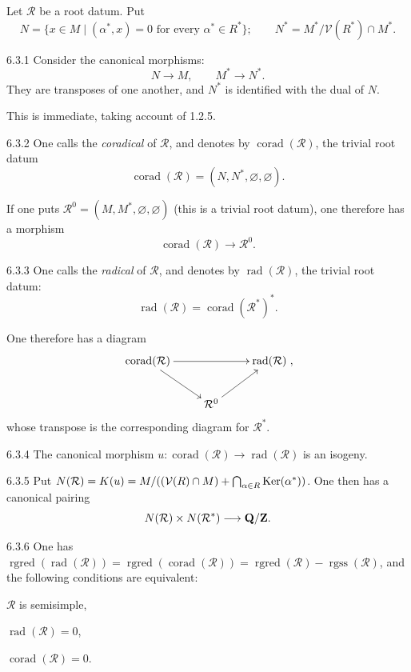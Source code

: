 Let $\mathcal R$ be a root datum. Put
\[
N=\{x\in M\mid(\alpha^*,x)=0\text{ for every }\alpha^*\in R^*\};\qquad
N^*=M^*/\mathcal V(R^*)\cap M^*.
\]
\begin{lemma}{6.3.1}\label{XXI.6.3.1}
Consider the canonical morphisms:
\[
N\to M,\qquad M^*\to N^*.
\]
They are transposes of one another, and $N^*$ is identified with the dual of $N$.
\end{lemma}
This is immediate, taking account of 1.2.5.
\begin{definition}{6.3.2}\label{XXI.6.3.2}
One calls the \emph{coradical} of $\mathcal R$, and denotes by $\operatorname{corad}(\mathcal R)$, the trivial root datum
\[
\operatorname{corad}(\mathcal R)=(N,N^*,\varnothing,\varnothing).
\]
\end{definition}
If one puts $\mathcal R^0=(M,M^*,\varnothing,\varnothing)$ (this is a trivial root datum), one therefore has a morphism
\[
\operatorname{corad}(\mathcal R)\to\mathcal R^0.
\]
\begin{definition}{6.3.3}\label{XXI.6.3.3}
One calls the \emph{radical} of $\mathcal R$, and denotes by $\operatorname{rad}(\mathcal R)$, the trivial root datum:
\[
\operatorname{rad}(\mathcal R)=\operatorname{corad}(\mathcal R^*)^*.
\]
{\renewcommand{\thefootnote}{(25)}}
\end{definition}
One therefore has a diagram
\[
\xymatrix{\operatorname{corad}(\mathcal R)\ar[rr]\ar[dr]&&\operatorname{rad}(\mathcal R)\\
&\mathcal R^0\ar[ur]&},
\]
whose transpose is the corresponding diagram for $\mathcal R^*$.
\begin{lemma}{6.3.4}\label{XXI.6.3.4}
The canonical morphism $u:\operatorname{corad}(\mathcal R)\to\operatorname{rad}(\mathcal R)$ is an isogeny.
\end{lemma}
\begin{definition}{6.3.5}\label{XXI.6.3.5}
Put $N(\mathcal R)=K(u)=M/((\mathcal V(R)\cap M)+\bigcap_{\alpha\in R}\operatorname{Ker}(\alpha^*))$. One then has a canonical pairing
\[
N(\mathcal R)\times N(\mathcal R^*)\longrightarrow\mathbf{Q}/\mathbf{Z}.
\]
\end{definition}
\begin{lemma}{6.3.6}\label{XXI.6.3.6}
One has $\operatorname{rgred}(\operatorname{rad}(\mathcal R))=\operatorname{rgred}(\operatorname{corad}(\mathcal R))=\operatorname{rgred}(\mathcal R)-\operatorname{rgss}(\mathcal R)$, and the following conditions are equivalent:
\begin{enumeratei}
\item $\mathcal R$ is semisimple,
\item $\operatorname{rad}(\mathcal R)=0$,
\item $\operatorname{corad}(\mathcal R)=0$.
\end{enumeratei}
\end{lemma}
